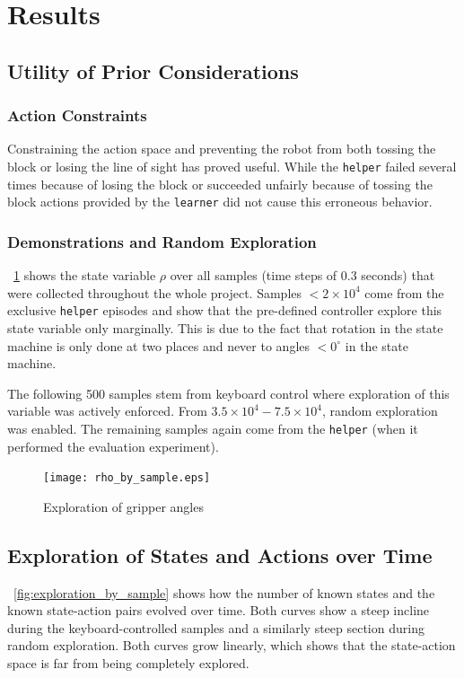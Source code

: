 \section{Results}

\subsection{Utility of Prior Considerations}

\subsubsection{Action Constraints}
Constraining the action space and preventing the robot from both tossing the block or losing the line of sight has proved useful. While the \texttt{helper} failed several times because of losing the block or succeeded unfairly because of tossing the block actions provided by the \texttt{learner} did not cause this erroneous behavior.

\subsubsection{Demonstrations and Random Exploration}
\figurename~\ref{fig:rho_by_sample} shows the state variable $\rho$ over all samples (time steps of 0.3 seconds) that were collected throughout the whole project. Samples $< 2 \times 10^4$ come from the exclusive \texttt{helper} episodes and show that the pre-defined controller explore this state variable only marginally. This is due to the fact that rotation in the state machine is only done at two places and never to angles $< 0^\circ$ in the state machine.

The following 500 samples stem from keyboard control where exploration of this variable was actively enforced. From $3.5 \times 10^4 - 7.5\times 10^4$, random exploration was enabled. The remaining samples again come from the \texttt{helper} (when it performed the evaluation experiment).


\begin{figure}
	\centering
	\texttt{[image: rho\_by\_sample.eps]}
	\caption{Exploration of gripper angles}
	\label{fig:rho_by_sample}
\end{figure}


\subsection{Exploration of States and Actions over Time}
\figurename~\ref{fig:exploration_by_sample} shows how the number of known states and the known state-action pairs evolved over time. Both curves show a steep incline during the keyboard-controlled samples and a similarly steep section during random exploration. Both curves grow linearly, which shows that the state-action space is far from being completely explored.

